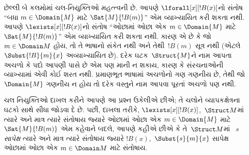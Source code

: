 \begin{explain}
છેલ્લી બે કલમોમાં ચલ-નિયુક્તિઓ
મહત્ત્વની છે. આપણે $\lforall[x][!B(x)]$નો સંતોષ
``બધા $m \in \Domain{M}$ માટે $\Sat{M}{!B(m)}$'' એમ વ્યાખ્યાયિત કરી
શકતા નથી. આપણે $\lexists[x][!B(x)]$નો સંતોષ
``ઓછામાં ઓછા એક $m \in \Domain{M}$ માટે $\Sat{M}{!B(m)}$'' એમ
વ્યાખ્યાયિત કરી શકતા નથી. કારણ એ છે કે જો $m \in \Domain M$ હોય,
તો તે ભાષાનો સંકેત નથી અને તેથી~$!B(m)$ સૂત્ર નથી (એટલે
$\Subst{!B}{m}{x}$ અવ્યાખ્યાયિત છે). દરેક ઘટક~$\Struct{M}$ને
નામ આપતા અચળો કે પદો આપણી પાસે છે એમ પણ માની ન શકાય, કારણ
કે સંરચનાઓની વ્યાખ્યામાં એવી કોઈ શરત નથી. પ્રમાણભૂત ભાષામાં
અચળોનો ગણ ગણનીય છે, તેથી જો $\Domain{M}$
ગણનીય ન હોય તો દરેક વસ્તુને નામ આપવા પૂરતાં અચળો પણ
નથી.

ચલ નિયુક્તિઓ દાખલ કરીને આપણે આ પ્રશ્ન ઉકેલીએ છીએ; તે ચલોને વ્યાપકક્ષેત્રના
ઘટકો સાથે સીધા જોડવા દે છે. પછી, દાખલા તરીકે,
$\lexists[x][!B(x)]$,~$\Struct M$માં
ત્યારે અને માત્ર ત્યારે સંતોષાય જ્યારે
ઓછામાં ઓછા એક $m \in \Domain{M}$ માટે
$\Sat{M}{!B(m)}$ એમ કહેવાને બદલે, આપણે કહીએ છીએ કે તે~$\Struct M$માં
~$s$ \emph{સાપેક્ષ} ત્યારે અને માત્ર ત્યારે સંતોષાય જ્યારે
$!B(x)$,~$\Subst{s}{m}{x}$ સાપેક્ષ ઓછામાં ઓછા
એક $m \in \Domain M$ માટે સંતોષાય.
\end{explain}

